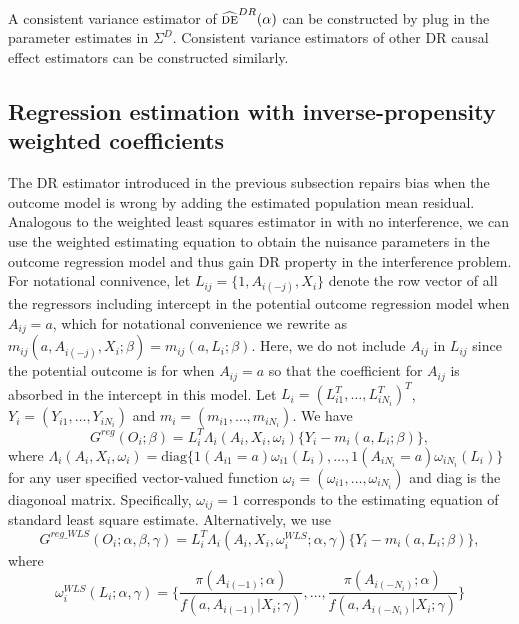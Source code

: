\documentclass[oupdraft]{biostatistics}
\begin{document}

A consistent variance estimator of $\widehat{\textsc{de}}^{DR}(\alpha)$ can be constructed by plug in the parameter estimates in $\Sigma^D$. Consistent variance estimators of other DR causal effect estimators can be constructed similarly.


\subsection{Regression estimation with inverse-propensity weighted coefficients}\label{subsec: DR_WLS}


The DR estimator introduced in the previous subsection repairs bias when the outcome model is wrong by adding the estimated population mean residual. Analogous to the weighted least squares estimator in \citet{kang2007demystifying} with no interference, we can use the weighted estimating equation to obtain the nuisance parameters in the outcome regression model and thus gain DR property in the interference problem. For notational connivence, let $L_{ij}=\{1,A_{i(-j)},X_i\}$ denote the row vector of all the regressors including intercept in the potential outcome regression model when $A_{ij}=a$, which for notational convenience we rewrite as $m_{ij}(a,A_{i(-j)},X_i;\beta)=m_{ij}(a,L_i;\beta)$. Here, we do not include $A_{ij}$ in $L_{ij}$ since the potential outcome is for when $A_{ij}=a$ so that the coefficient for $A_{ij}$ is absorbed in the intercept in this model. Let $L_i=(L_{i1}^T,\ldots,L_{iN_i}^T)^T$, $Y_i=(Y_{i1},\ldots,Y_{iN_i})$ and $ m_i=(m_{i1},\ldots,m_{iN_i})$. We have $$G^{reg}(O_i;\beta)=L_i^T\Lambda_i(A_i,X_i,\omega_{i})\{Y_i- m_i(a,L_i;\beta)\},$$ 
where  $\Lambda_i(A_i,X_i,\omega_{i})=\text{diag}\biggl\{1(A_{i1}=a)\omega_{i1}(L_{i}),\ldots,1(A_{iN_i}=a)\omega_{iN_i}(L_{i})\biggr\}$ for any user specified vector-valued  function $\omega_{i}=(\omega_{i1},\ldots,\omega_{iN_i})$ and diag is the diagonoal matrix. Specifically, $\omega_{ij}=1$ corresponds to the estimating equation of standard least square estimate. Alternatively, we use $$G^{reg\_WLS}(O_i;\alpha,\beta,\gamma)=L_i^T\Lambda_i(A_i,X_i,\omega_{i}^{WLS};\alpha,\gamma)\{Y_i- m_i(a,L_i;\beta)\},$$ where
$$\omega_i^{WLS}(L_i;\alpha,\gamma)=\biggl\{\frac{\pi(A_{i(-1)};\alpha)}{{f}(a,A_{i(-1)}|X_i;\gamma)}
  ,\ldots,\frac{\pi(A_{i(-N_i)};\alpha)}{{f}(a,A_{i(-N_i)}|X_i;\gamma)}
  \biggr\}$$
  
\end{document}
